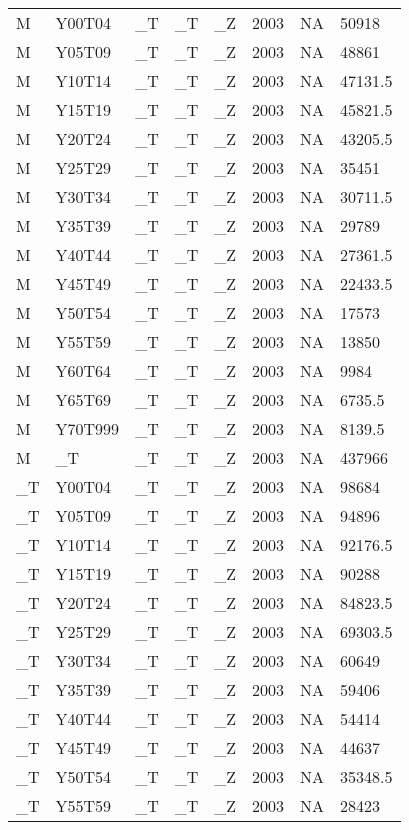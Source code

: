 \begin{longtable}[t]{llllllll}
M & Y00T04 & \_T & \_T & \_Z & 2003 & NA & 50918\\
M & Y05T09 & \_T & \_T & \_Z & 2003 & NA & 48861\\
M & Y10T14 & \_T & \_T & \_Z & 2003 & NA & 47131.5\\
\addlinespace
M & Y15T19 & \_T & \_T & \_Z & 2003 & NA & 45821.5\\
M & Y20T24 & \_T & \_T & \_Z & 2003 & NA & 43205.5\\
M & Y25T29 & \_T & \_T & \_Z & 2003 & NA & 35451\\
M & Y30T34 & \_T & \_T & \_Z & 2003 & NA & 30711.5\\
M & Y35T39 & \_T & \_T & \_Z & 2003 & NA & 29789\\
\addlinespace
M & Y40T44 & \_T & \_T & \_Z & 2003 & NA & 27361.5\\
M & Y45T49 & \_T & \_T & \_Z & 2003 & NA & 22433.5\\
M & Y50T54 & \_T & \_T & \_Z & 2003 & NA & 17573\\
M & Y55T59 & \_T & \_T & \_Z & 2003 & NA & 13850\\
M & Y60T64 & \_T & \_T & \_Z & 2003 & NA & 9984\\
\addlinespace
M & Y65T69 & \_T & \_T & \_Z & 2003 & NA & 6735.5\\
M & Y70T999 & \_T & \_T & \_Z & 2003 & NA & 8139.5\\
M & \_T & \_T & \_T & \_Z & 2003 & NA & 437966\\
\_T & Y00T04 & \_T & \_T & \_Z & 2003 & NA & 98684\\
\_T & Y05T09 & \_T & \_T & \_Z & 2003 & NA & 94896\\
\addlinespace
\_T & Y10T14 & \_T & \_T & \_Z & 2003 & NA & 92176.5\\
\_T & Y15T19 & \_T & \_T & \_Z & 2003 & NA & 90288\\
\_T & Y20T24 & \_T & \_T & \_Z & 2003 & NA & 84823.5\\
\_T & Y25T29 & \_T & \_T & \_Z & 2003 & NA & 69303.5\\
\_T & Y30T34 & \_T & \_T & \_Z & 2003 & NA & 60649\\
\addlinespace
\_T & Y35T39 & \_T & \_T & \_Z & 2003 & NA & 59406\\
\_T & Y40T44 & \_T & \_T & \_Z & 2003 & NA & 54414\\
\_T & Y45T49 & \_T & \_T & \_Z & 2003 & NA & 44637\\
\_T & Y50T54 & \_T & \_T & \_Z & 2003 & NA & 35348.5\\
\_T & Y55T59 & \_T & \_T & \_Z & 2003 & NA & 28423\\

\end{longtable}
